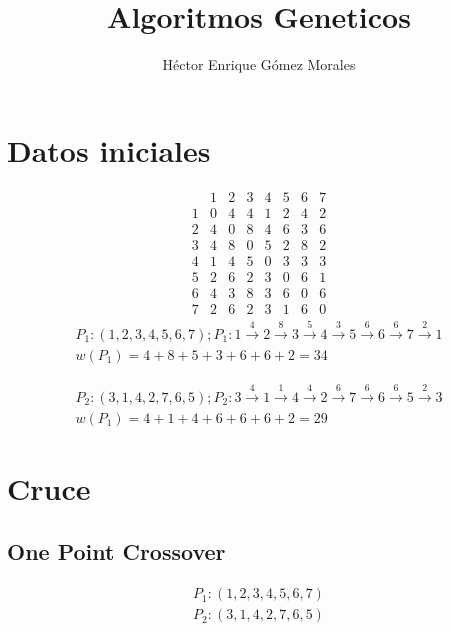 \documentclass{article}
\author{Héctor Enrique Gómez Morales}
\title{Algoritmos Geneticos}
\begin{document}
\maketitle
\section{Datos iniciales}
\begin{equation*}
  \begin{matrix}
    &  1& 2 & 3&  4&  5&  6& 7\\
    1&  0&  4&  4&  1& 2&  4& 2\\
    2&  4&  0&  8&  4&  6&  3& 6\\
    3&  4&  8&  0&  5&  2&  8& 2\\
    4&  1&  4&  5&  0&  3&  3& 3\\
    5&  2&  6&  2&  3&  0&  6& 1\\
    6&  4&  3&  8&  3&  6&  0& 6\\
    7&  2&  6&  2&  3&  1&  6& 0
  \end{matrix}
\end{equation*}
\begin{equation*}
  \begin{split}
    P_1: (1,2,3,4,5,6,7); P_1: 1 \overset{4}{\rightarrow} 2 \overset{8}{\rightarrow} 3 \overset{5}{\rightarrow} 4 \overset{3}{\rightarrow} 5 \overset{6}{\rightarrow} 6 \overset{6}{\rightarrow} 7 \overset{2}{\rightarrow} 1\\
    w(P_1) = 4 + 8 + 5 + 3 + 6 + 6 + 2 = 34
  \end{split}
\end{equation*}

\begin{equation*}
  \begin{split}
    P_2: (3,1,4,2,7,6,5); P_2: 3 \overset{4}{\rightarrow} 1 \overset{1}{\rightarrow} 4 \overset{4}{\rightarrow} 2 \overset{6}{\rightarrow} 7 \overset{6}{\rightarrow} 6 \overset{6}{\rightarrow} 5 \overset{2}{\rightarrow} 3\\
    w(P_1) = 4 + 1 + 4 + 6 + 6 + 6 + 2 = 29
  \end{split}
\end{equation*}
\section{Cruce}
\subsection{One Point Crossover}
\begin{equation*}
  \begin{split}
    P_1: (\boxed{1,2,3,4},5,6,7)\\
    P_2: (\boxed{3,1,4,2},7,6,5)
  \end{split}
\end{equation*}
\end{document}
